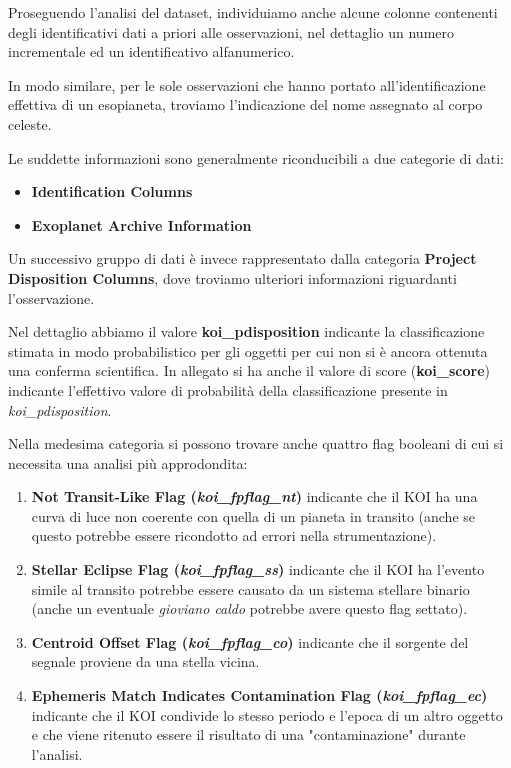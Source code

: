 Proseguendo l'analisi del dataset, individuiamo anche alcune colonne 
contenenti degli identificativi dati a priori alle osservazioni, nel dettaglio 
un numero incrementale ed un identificativo alfanumerico.

In modo similare, per le sole osservazioni che hanno portato all'identificazione 
effettiva di un esopianeta, troviamo l'indicazione del nome assegnato al corpo celeste. 

Le suddette informazioni sono generalmente riconducibili a due categorie di dati:
\begin{itemize}
    \item \textbf{Identification Columns}
    \item \textbf{Exoplanet Archive Information}
\end{itemize}

Un successivo gruppo di dati è invece rappresentato dalla categoria 
\textbf{Project Disposition Columns}, dove troviamo ulteriori informazioni 
riguardanti l'osservazione.

Nel dettaglio abbiamo il valore \textbf{koi\_pdisposition} indicante la 
classificazione stimata in modo probabilistico per gli oggetti per cui 
non si è ancora ottenuta una conferma scientifica.
In allegato si ha anche il valore di score (\textbf{koi\_score})
indicante l'effettivo valore di probabilità della classificazione presente in
\textit{koi\_pdisposition}.

Nella medesima categoria si possono trovare anche quattro flag booleani di cui 
si necessita una analisi più approdondita:
\begin{enumerate}
    \item \textbf{Not Transit-Like Flag (\textit{koi\_fpflag\_nt})} indicante
    che il KOI ha una curva di luce non coerente con quella di un pianeta in 
    transito (anche se questo potrebbe essere ricondotto ad errori nella 
    strumentazione).
    \item \textbf{Stellar Eclipse Flag (\textit{koi\_fpflag\_ss})} indicante
    che il KOI ha l'evento simile al transito potrebbe essere causato da un 
    sistema stellare binario (anche un eventuale \textit{gioviano caldo} 
    potrebbe avere questo flag settato).
    \item \textbf{Centroid Offset Flag (\textit{koi\_fpflag\_co})} indicante
    che il sorgente del segnale proviene da una stella vicina.
    \item \textbf{Ephemeris Match Indicates Contamination Flag
    (\textit{koi\_fpflag\_ec})} indicante che il KOI condivide lo stesso periodo
    e l'epoca di un altro oggetto e che viene ritenuto essere il risultato di
    una "contaminazione" durante l'analisi.
\end{enumerate}

